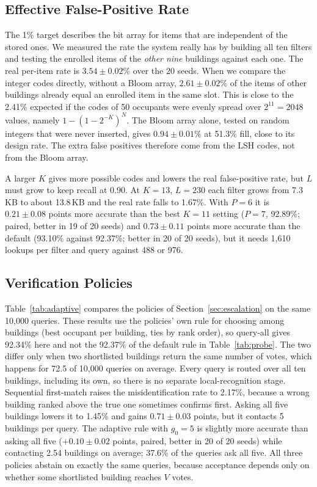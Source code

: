 \documentclass[runningheads]{llncs}
\begin{document}
\subsection{Effective False-Positive Rate}
\label{sec:fpr}

The 1\% target describes the bit array for items that are independent of the stored ones. We measured the rate the
system really has by building all ten filters and testing the enrolled items of the \emph{other nine} buildings
against each one. The real per-item rate is $3.54 \pm 0.02\%$ over the 20 seeds. When we compare the integer codes
directly, without a Bloom array, $2.61 \pm 0.02\%$ of the items of other buildings already equal an enrolled item in the
same slot. This is close to the 2.41\% expected if the codes of 50 occupants were evenly spread over
$2^{11}=2048$ values, namely $1-(1-2^{-K})^{N}$. The Bloom array alone, tested on random integers that were never
inserted, gives $0.94 \pm 0.01\%$ at 51.3\% fill, close to its design rate. The extra false positives therefore come
from the LSH codes, not from the Bloom array.

A larger $K$ gives more possible codes and lowers the real false-positive rate, but $L$ must grow to keep recall at
0.90. At $K=13$, $L=230$ each filter grows from 7.3\,KB to about 13.8\,KB and the real rate falls to
1.67\%. With $P=6$ it is $0.21 \pm 0.08$ points more accurate than the best $K=11$ setting ($P=7$,
92.89\%; paired, better in 19 of 20 seeds) and $0.73 \pm 0.11$ points more accurate than the
default (93.10\% against 92.37\%; better in 20 of 20 seeds), but it needs 1,610 lookups
per filter and query against 488 or 976.

\subsection{Verification Policies}
\label{sec:adaptive}

Table~\ref{tab:adaptive} compares the policies of Section~\ref{sec:escalation} on the same 10,000 queries. These
results use the policies' own rule for choosing among buildings (best occupant per building, ties by rank order), so
query-all gives 92.34\% here and not the 92.37\% of the default rule in Table~\ref{tab:probe}. The two differ
only when two shortlisted buildings return the same number of votes, which happens for 72.5 of 10,000 queries on
average. Every query is routed over all ten buildings, including its own, so there is no separate local-recognition
stage. Sequential first-match raises the misidentification rate to 2.17\%, because a wrong building ranked above
the true one sometimes confirms first. Asking all five buildings lowers it to 1.45\% and gains $0.71 \pm 0.03$ points,
but it contacts 5 buildings per query. The adaptive rule with $g_0=5$ is slightly more accurate than asking all five
($+0.10 \pm 0.02$ points, paired, better in 20 of 20 seeds) while contacting 2.54 buildings on average;
37.6\% of the queries ask all five. All three policies abstain on exactly the same queries, because acceptance
depends only on whether some shortlisted building reaches $V$ votes.
\end{document}
